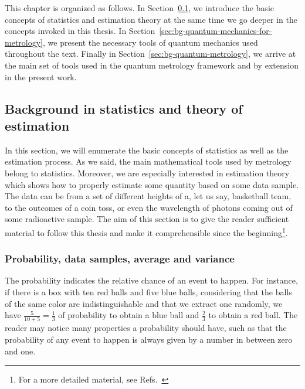 This chapter is organized as follows.
In Section~\ref{sec:bg-statistics-and-stimation}, we introduce the basic concepts of statistics and estimation theory at the same time we go deeper in the concepts invoked in this thesis.
In Section~\ref{sec:bg-quantum-mechanics-for-metrology}, we present the necessary tools of quantum mechanics used throughout the text.
Finally in Section~\ref{sec:bg-quantum-metrology}, we arrive at the main set of tools used in the quantum metrology framework and by extension in the present work.

\subsection{Background in statistics and theory of estimation}
\label{sec:bg-statistics-and-stimation}

In this section, we will enumerate the basic concepts of statistics as well as the estimation process.
As we said, the main mathematical tools used by metrology belong to statistics.
Moreover, we are especially interested in estimation theory which shows how to properly estimate some quantity based on some data sample.
The data can be from a set of different heights of a, let us say, basketball team, to the outcomes of a coin toss, or even the wavelength of photons coming out of some radioactive sample.
The aim of this section is to give the reader sufficient material to follow this thesis and make it comprehensible since the beginning\footnote{
For a more detailed material, see Refs.~\cite{Riley2006, Barlow1989}}.

\subsubsection{Probability, data samples, average and variance}

The probability indicates the relative chance of an event to happen.
For instance, if there is a box with ten red balls and five blue balls, considering that the balls of the same color are indistinguishable and that we extract one randomly, we have $\frac{5}{10+5}=\frac{1}{3}$ of probability to obtain a blue ball and $\frac{2}{3}$ to obtain a red ball.
The reader may notice many properties a probability should have, such as that the probability of any event to happen is always given by a number in between zero and one.

